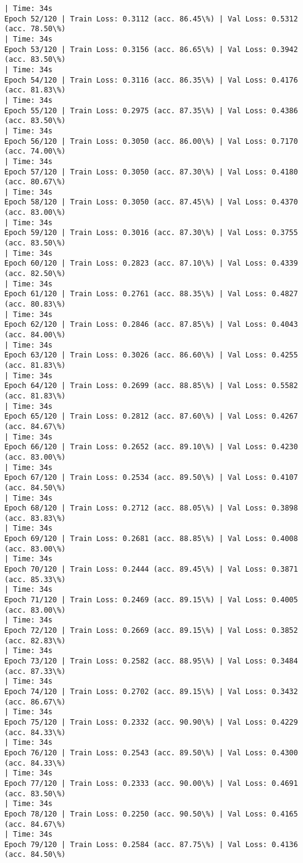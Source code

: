 \documentclass[8pt]{extarticle}
\begin{document}
\begin{Verbatim}[commandchars=\\\{\}]
| Time: 34s
Epoch 52/120 | Train Loss: 0.3112 (acc. 86.45\%) | Val Loss: 0.5312 (acc. 78.50\%)
| Time: 34s
Epoch 53/120 | Train Loss: 0.3156 (acc. 86.65\%) | Val Loss: 0.3942 (acc. 83.50\%)
| Time: 34s
Epoch 54/120 | Train Loss: 0.3116 (acc. 86.35\%) | Val Loss: 0.4176 (acc. 81.83\%)
| Time: 34s
Epoch 55/120 | Train Loss: 0.2975 (acc. 87.35\%) | Val Loss: 0.4386 (acc. 83.50\%)
| Time: 34s
Epoch 56/120 | Train Loss: 0.3050 (acc. 86.00\%) | Val Loss: 0.7170 (acc. 74.00\%)
| Time: 34s
Epoch 57/120 | Train Loss: 0.3050 (acc. 87.30\%) | Val Loss: 0.4180 (acc. 80.67\%)
| Time: 34s
Epoch 58/120 | Train Loss: 0.3050 (acc. 87.45\%) | Val Loss: 0.4370 (acc. 83.00\%)
| Time: 34s
Epoch 59/120 | Train Loss: 0.3016 (acc. 87.30\%) | Val Loss: 0.3755 (acc. 83.50\%)
| Time: 34s
Epoch 60/120 | Train Loss: 0.2823 (acc. 87.10\%) | Val Loss: 0.4339 (acc. 82.50\%)
| Time: 34s
Epoch 61/120 | Train Loss: 0.2761 (acc. 88.35\%) | Val Loss: 0.4827 (acc. 80.83\%)
| Time: 34s
Epoch 62/120 | Train Loss: 0.2846 (acc. 87.85\%) | Val Loss: 0.4043 (acc. 84.00\%)
| Time: 34s
Epoch 63/120 | Train Loss: 0.3026 (acc. 86.60\%) | Val Loss: 0.4255 (acc. 81.83\%)
| Time: 34s
Epoch 64/120 | Train Loss: 0.2699 (acc. 88.85\%) | Val Loss: 0.5582 (acc. 81.83\%)
| Time: 34s
Epoch 65/120 | Train Loss: 0.2812 (acc. 87.60\%) | Val Loss: 0.4267 (acc. 84.67\%)
| Time: 34s
Epoch 66/120 | Train Loss: 0.2652 (acc. 89.10\%) | Val Loss: 0.4230 (acc. 83.00\%)
| Time: 34s
Epoch 67/120 | Train Loss: 0.2534 (acc. 89.50\%) | Val Loss: 0.4107 (acc. 84.50\%)
| Time: 34s
Epoch 68/120 | Train Loss: 0.2712 (acc. 88.05\%) | Val Loss: 0.3898 (acc. 83.83\%)
| Time: 34s
Epoch 69/120 | Train Loss: 0.2681 (acc. 88.85\%) | Val Loss: 0.4008 (acc. 83.00\%)
| Time: 34s
Epoch 70/120 | Train Loss: 0.2444 (acc. 89.45\%) | Val Loss: 0.3871 (acc. 85.33\%)
| Time: 34s
Epoch 71/120 | Train Loss: 0.2469 (acc. 89.15\%) | Val Loss: 0.4005 (acc. 83.00\%)
| Time: 34s
Epoch 72/120 | Train Loss: 0.2669 (acc. 89.15\%) | Val Loss: 0.3852 (acc. 82.83\%)
| Time: 34s
Epoch 73/120 | Train Loss: 0.2582 (acc. 88.95\%) | Val Loss: 0.3484 (acc. 87.33\%)
| Time: 34s
Epoch 74/120 | Train Loss: 0.2702 (acc. 89.15\%) | Val Loss: 0.3432 (acc. 86.67\%)
| Time: 34s
Epoch 75/120 | Train Loss: 0.2332 (acc. 90.90\%) | Val Loss: 0.4229 (acc. 84.33\%)
| Time: 34s
Epoch 76/120 | Train Loss: 0.2543 (acc. 89.50\%) | Val Loss: 0.4300 (acc. 84.33\%)
| Time: 34s
Epoch 77/120 | Train Loss: 0.2333 (acc. 90.00\%) | Val Loss: 0.4691 (acc. 83.50\%)
| Time: 34s
Epoch 78/120 | Train Loss: 0.2250 (acc. 90.50\%) | Val Loss: 0.4165 (acc. 84.67\%)
| Time: 34s
Epoch 79/120 | Train Loss: 0.2584 (acc. 87.75\%) | Val Loss: 0.4136 (acc. 84.50\%)

\end{Verbatim}
\end{document}
